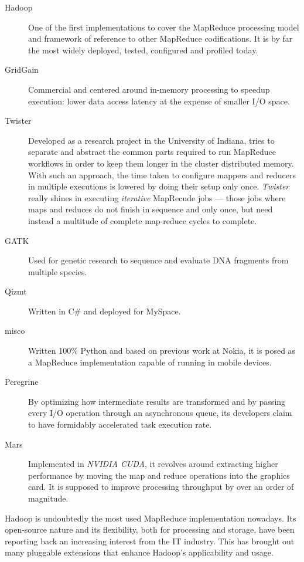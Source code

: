 \begin{description}
 \item[Hadoop] \cite{hadoopdefguide} One of the first implementations to cover the MapReduce processing model and framework of reference to other MapReduce codifications. It is by far the most widely deployed, tested, configured and profiled today.
 \item[GridGain] \cite{gridgainvshadoop} Commercial and centered around in-memory processing to speedup execution: lower data access latency at the expense of smaller I/O space.
 \item[Twister] \cite{twister} Developed as a research project in the University of Indiana, tries to separate and abstract the common parts required to run MapReduce workflows in order to keep them longer in the cluster distributed memory. With such an approach, the time taken to configure mappers and reducers in multiple executions is lowered by doing their setup only once. \emph{Twister} really shines in executing \emph{iterative} MapRecude jobs --- those jobs where maps and reduces do not finish in sequence and only once, but need instead a multitude of complete map-reduce cycles to complete.
 \item[GATK] \cite{gatk} Used for genetic research to sequence and evaluate DNA fragments from multiple species.
 \item[Qizmt] \cite{qizmt} Written in C\# and deployed for MySpace.
 \item[misco] \cite{misco} Written 100\% Python and based on previous work at Nokia, it is posed as a MapReduce implementation capable of running in mobile devices.
 \item[Peregrine] \cite{peregrine} By optimizing how intermediate results are transformed and by passing every I/O operation through an asynchronous queue, its developers claim to have formidably accelerated task execution rate.
 \item[Mars] \cite{mars} Implemented in \emph{NVIDIA CUDA}, it revolves around extracting higher performance by moving the map and reduce operations into the graphics card. It is supposed to improve processing throughput by over an order of magnitude.
\end{description}

Hadoop is undoubtedly the most used MapReduce implementation nowadays. Its open-source nature and its flexibility, both for processing and storage, have been reporting back an increasing interest from the IT industry. This has brought out many pluggable extensions that enhance Hadoop's applicability and usage.

